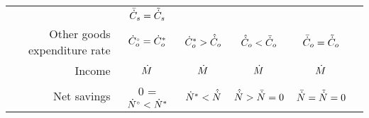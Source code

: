 \begin{landscape}
\begin{table}
\begin{tabular}{r c c c c c}
                                  & $\bar{\dot{C}}_s  = \tilde{\dot{C}}_s$ \\
%
Other goods expenditure rate      & ${}{\dot{C}}^{\scriptscriptstyle \circ}_o  = {\dot{C}}^*_o$         
                                  & ${\dot{C}}^*_o   > \hat{\dot{C}}_o$ 
                                  & $\hat{\dot{C}}_o   < \bar{\dot{C}}_o$ 
                                  & $\bar{\dot{C}}_o  = \tilde{\dot{C}}_o$ \\
%
Income                            & $\dot{M}$         
                                  & $\dot{M}$ 
                                  & $\dot{M}$ 
                                  & $\dot{M}$  \\
%
Net savings                       & 0 = ${}{\dot{N}}^{\scriptscriptstyle \circ} <   {\dot{N}}^*$         
                                  & ${\dot{N}}^*      <   \hat{\dot{N}}$ 
                                  & $\hat{\dot{N}}      >   \bar{\dot{N}} = 0$ 
                                  & $\bar{\dot{N}}    =   \tilde{\dot{N}} = 0$  \\
\bottomrule
\end{tabular}


\end{table}

\end{landscape}

